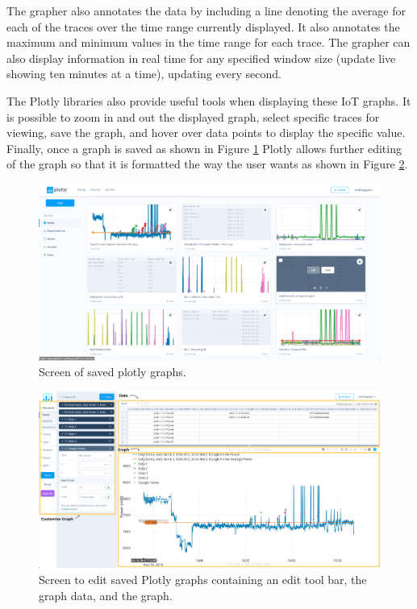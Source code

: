 The grapher also annotates the data by including a line denoting the average for each of the traces over the time range currently displayed. It also annotates the maximum and minimum values in the time range for each trace. The grapher can also display information in real time for any specified window size (update live showing ten minutes at a time), updating every second.

The Plotly libraries also provide useful tools when displaying these IoT graphs. It is possible to zoom in and out the displayed graph, select specific traces for viewing, save the graph, and hover over data points to display the specific value. Finally, once a graph is saved as shown in Figure \ref{fig:plotlySave} Plotly allows further editing of the graph so that it is formatted the way the user wants as shown in Figure \ref{fig:plotlyEdit}.

\begin{figure}[H]
    \centering
    \includegraphics[width=1\textwidth]{figures/plotlySave.png}
    \caption{Screen of saved plotly graphs.}
    \label{fig:plotlySave}
\end{figure}

\begin{figure}[H]
    \centering
    \includegraphics[width=1\textwidth]{figures/plotlyEdit.png}
    \caption{Screen to edit saved Plotly graphs containing an edit tool bar, the graph data, and the graph.}
    \label{fig:plotlyEdit}
\end{figure}

